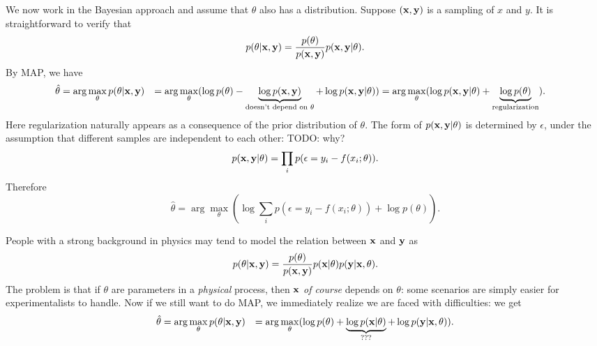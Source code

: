 \documentclass[hyperref, a4paper, 12pt]{report}
\newcommand*{\argmax}{\arg\max}
\def\\{}%
\begin{document}
We now work in the Bayesian approach and assume that $\theta$ also has a distribution.
Suppose $(\vb{x}, \vb{y})$ is a sampling of $x$ and $y$.
It is straightforward to verify that
\begin{equation}
    p(\theta|\vb{x}, \vb{y}) = \frac{p(\theta)}{p(\vb{x}, \vb{y})} p(\vb{x}, \vb{y} | \theta).
\end{equation}
By MAP, we have 
\begin{equation}
    \begin{aligned}
        \hat{\theta} &= \argmax_\theta p(\theta | \vb{x}, \vb{y}) \\
        &= \argmax_\theta (\log p(\theta) - \underbrace{\log p(\vb{x}, \vb{y})}_{\text{doesn't  depend on $\theta$}} + \log p(\vb{x}, \vb{y} | \theta)) \\
        &= \argmax_\theta (\log p(\vb{x},  \vb{y} | \theta) + \underbrace{\log p(\theta)}_{\text{regularization}}) .
    \end{aligned}
\end{equation}
Here regularization naturally appears as a consequence of the prior distribution of $\theta$.
The form of $p(\vb{x}, \vb{y} | \theta)$ is determined by $\epsilon$,
under the assumption that different samples are independent to each other: TODO: why?
\begin{equation}
    p(\vb{x}, \vb{y} | \theta) = \prod_i p(\epsilon = y_i - f(x_i; \theta)).
\end{equation}
Therefore 
\begin{equation}
    \hat{\theta} = \argmax_\theta \left( \log \sum_i p(\epsilon = y_i- f(x_i; \theta)) + \log p(\theta) \right).
\end{equation}

People with a strong background in physics may tend to model the relation between $\vb{x}$ and $\vb{y}$ as 
\begin{equation}
    p(\theta | \vb{x}, \vb{y}) = \frac{p(\theta)}{p(\vb{x}, \vb{y})} p(\vb{x} | \theta) p(\vb{y} | \vb{x}, \theta).
\end{equation}
The problem is that if $\theta$ are parameters in a \emph{physical} process,
then $\vb{x}$ \emph{of course} depends on $\theta$:
some scenarios are simply easier for experimentalists to handle.
Now if we still want to do MAP, we immediately realize we are faced with difficulties: we get 
\begin{equation}
    \begin{aligned}
        \hat{\theta} &= \argmax_\theta p(\theta | \vb{x}, \vb{y}) \\
        &= \argmax_\theta (\log p(\theta) + \underbrace{\log p(\vb{x} | \theta)}_{\text{???}} + \log p(\vb{y} | \vb{x}, \theta)) .
    \end{aligned}
\end{equation}
\end{document}
